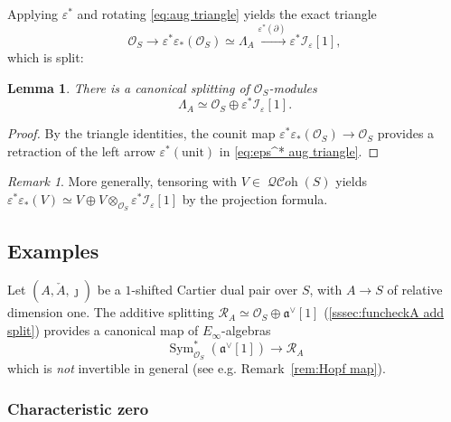 \documentclass[12pt, oneside]{amsart}
\numberwithin{equation}{section}
\newtheorem{lemma}[subsubsection]{Lemma}
\theoremstyle{remark}
\newtheorem{remark}[subsubsection]{Remark}
\theoremstyle{plain}
\DeclareMathOperator{\QCOH}{\mathcal{QC}\textit{oh}}
\newcommand{\R}{\mathcal{R}}
\newcommand{\RA}{\R_A}
\newcommand{\frav}{\mathfrak{a}^\vee}
\newcommand{\lam}{\Lambda}
\newcommand{\OO}{\mathcal{O}}
\DeclareMathOperator{\Sym}{Sym}
\newcommand{\eps}{\varepsilon}
\begin{document}
Applying $\eps^*$ and rotating \eqref{eq:aug triangle} yields the exact triangle
\begin{equation}\label{eq:eps^* aug triangle}
\OO_S
\to \eps^*\eps_*(\OO_S)
\simeq \lam_A
\xrightarrow{\eps^* (\partial)} \eps^* \mathcal{I}_{\eps}[1],
\end{equation}
which is split:

\begin{lemma}\label{lem:lam splitting}
  There is a canonical splitting of $\OO_S$-modules
  \[ \lam_A \simeq \OO_S \oplus \eps^* \mathcal{I}_{\eps}[1]. \]
\end{lemma}
\begin{proof}
  By the triangle identities, the counit map $\eps^*\eps_*(\OO_S) \to \OO_S$ provides a retraction of the left arrow $\eps^*(\mathrm{unit})$ in \eqref{eq:eps^* aug triangle}.
\end{proof}

\begin{remark}
  More generally, tensoring with $V \in \QCOH(S)$ yields $\eps^*\eps_*(V) \simeq V \oplus V \otimes_{\OO_S} \eps^* \mathcal{I}_{\eps}[1]$ by the projection formula.
\end{remark}

\subsection{Examples}

Let $(A, \check{A}, \jmath)$ be a $1$-shifted Cartier dual pair over $S$, with $A \to S$ of relative dimension one.
The additive splitting $\RA \simeq \OO_S \oplus \frav[1]$ (\ref{sssec:funcheckA add split}) provides a canonical map of $E_\infty$-algebras
\begin{equation}\label{eq:Sym to RA}
  \Sym^*_{\OO_S}(\frav[1]) \to \RA
\end{equation}
which is \emph{not} invertible in general (see e.g. Remark~\ref{rem:Hopf map}).

\subsubsection{Characteristic zero}\label{sssec:funcheckA char 0}
\end{document}
